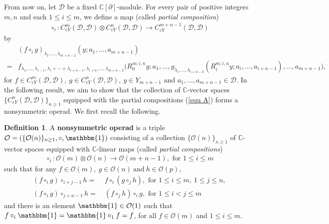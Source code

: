\documentclass[a4paper,reqno,10pt]{amsart}
\theoremstyle{plain}
\theoremstyle{definition}
\newtheorem{definition}[thm]{Definition}
\theoremstyle{remark}
\newcommand{\C}{\mathbb{C}}
\newcommand{\D}{\mathcal{D}}
\newcommand{\p}{\partial}
\newcommand{\la}{\lambda}
\begin{document}
\medskip

From now on, let $\D$ be a fixed $\C[\p]$-module. For every pair of positive integers $m,n$ and each $1 \leq i \leq m$, we define a map (called {\em partial composition}) 
        \begin{align*}
        \circ_i : C_{cY}^{m}(\D,\D) \otimes C_{cY}^{n}(\D,\D) \longrightarrow C_{cY}^{m+n-1}(\D,\D)
        \end{align*}
        by 
    \begin{align}
    \label{equ A}   
    &(f\circ _i g)_{\la_1 , \ldots , \la_{m+n-2}}(y;a_1,\ldots , a_{m+n-1}) \nonumber \\
    =& f_{\la _1, \ldots , \la_{i-1},\la_{i}+\cdots+\la_{i+n-1},\la_{i+n}, \ldots , \la_{m+n-2}} \big( R_{0}^{m;i,n}y;a_1, \ldots , g_{\la_i,\ldots,\la_{i+n-2}}(R_{i}^{m;i,n}y;a_i, \ldots, a_{i+n-1}),\ldots, a_{m+n-1} \big), 
 \end{align}
for $f \in C_{cY}^m(\D,\D),~ g \in C_{cY}^n(\D,\D), ~ y \in Y_{m+n-1} \text{ and } a_1, \ldots, a_{m+n-1} \in \D$.  In the following result, we aim to show that the collection of $\C$-vector spaces $\{C_{cY}^{n}(\D, \D)\}_{n \geq 1}$ equipped with the partial compositions (\ref{equ A}) forms a nonsymmetric operad. We first recall the following.

\medskip

\begin{definition}
    A {\bf nonsymmetric operad} is a triple $\mathcal{O} = (\{\mathcal{O}(n)\}_{n \geq 1}, \circ,  \mathbbm{1} )$ consisting of a collection $\{\mathcal{O}(n)\}_{n \geq 1} $ of $\C$-vector spaces equipped with $\C$-linear maps (called {\em partial compositions})
    \begin{align*}
        \circ_i :\mathcal{O}(m)\otimes \mathcal{O}(n) \longrightarrow \mathcal{O}(m+n-1),  \text{ for }  1 \leq i \leq m 
    \end{align*}
   such that for any $f \in \mathcal{O}(m), ~ \! g \in \mathcal{O}(n) \mathrm{~and~}  h \in \mathcal{O}(p)$, 
    \begin{align}
        (f \circ_i g) \circ_{i+j-1} h =~& f \circ_i (g \circ_j h),\text{ for } 1 \leq i \leq m ,~ \!  1 \leq j \leq n, \label{a-1}\\
        (f \circ_i g) \circ_{j+n-1} h =~& (f \circ_j h ) \circ_i g,\text{ for } 1 \leq i < j \leq m \label{a-2}
\end{align}
and there is an element $\mathbbm{1}\in \mathcal{O}(1)$ such that $f \circ_i \mathbbm{1} = \mathbbm{1} \circ_1 f= f$, for all $f \in \mathcal{O}(m) $ and $1 \leq i \leq m$.
\end{definition} 
\end{document}
